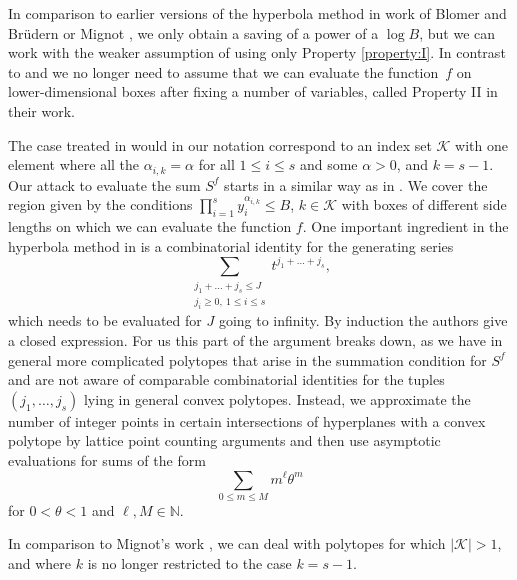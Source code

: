 \documentclass[11pt]{article}
\numberwithin{equation}{section}
\let\tet\theta
\newcommand{\calK}{\mathcal{K}}
\newcommand{\N}{\mathbb{N}}
\theoremstyle{definition}
\numberwithin{theorem}{section}
\begin{document}
In comparison to earlier versions of the hyperbola method in work of Blomer and Brüdern \cite{BB} or Mignot \cite{mignot2}, we only obtain a saving of a power of a $\log B$, but we can work with the weaker assumption of using only Property \ref{property:I}. In contrast to \cite{BB} and \cite{mignot2} we no longer need to assume that we can evaluate the function~$f$ on lower-dimensional boxes after fixing a number of variables, called Property II in their work.\par
The case treated in \cite{BB} would in our notation correspond to an index set $\calK$ with one element where all the $\alpha_{i,k}=\alpha$ for all $1\leq i\leq s$ and some $\alpha>0$, and $k=s-1$. Our attack to evaluate the sum $S^f$ starts in a similar way as in \cite{BB}. We cover the region given by the conditions $\prod_{i=1}^s y_i^{\alpha_{i,k}}\leq B$, $k\in \calK$ with boxes of different side lengths on which we can evaluate the function $f$. One important ingredient in the hyperbola method in \cite{BB} is a combinatorial identity for the generating series
\[
\sum_{\substack{j_1+\ldots +j_s\leq J\\ j_i\geq 0,\ 1\leq i\leq s}}t^{j_1+\ldots + j_s},
\]
which needs to be evaluated for $J$ going to infinity. By induction the authors give a closed expression. For us this part of the argument breaks down, as we have in general more complicated polytopes that arise in the summation condition for $S^f$ and are not aware of comparable combinatorial identities for the tuples $(j_1,\ldots, j_s)$ lying in general convex polytopes. Instead, we approximate the number of integer points in certain intersections of hyperplanes with a convex polytope by lattice point counting arguments and then use asymptotic evaluations for sums of the form
\[
\sum_{0\leq m\leq M} m^\ell \tet^m
\]
for $0<\tet<1$ and $\ell,M\in \N$.\par
In comparison to Mignot's work \cite{mignot2}, we can deal with polytopes for which $|\mathcal{K}|>1$, and where $k$ is no longer restricted to the case $k=s-1$.
\end{document}

